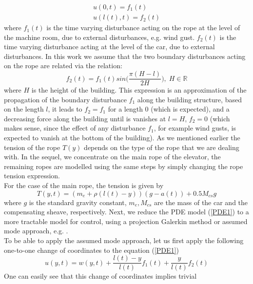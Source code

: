 \documentclass[letterpaper, 11 pt, conference]{ieeeconf}
\begin{document}
\begin{equation}\label{BC1}
\begin{array}{l}
u(0,t)=f_{1}(t)\\
u(l(t),t)=f_{2}(t)
\end{array}
\end{equation}
where $f_1(t)$ is the time varying disturbance acting on the rope
at the level of the machine room, due to external disturbances,
e.g. wind gust. $f_2(t)$ is the time varying disturbance acting at
the level of the car, due to external disturbances. In this work
we assume that the two boundary disturbances acting on the rope
are related via the relation:
\begin{equation}\label{BC_relation}
f_{2}(t)=f_{1}(t)sin\big(\frac{\pi(H-l)}{2H}\big),\;H\in\mathbb{R}
\end{equation}
where $H$ is the height of the building. This expression is an
approximation of the propagation of the boundary disturbance
$f_{1}$ along the building structure, based on the length $l$, it
leads to $f_{2}=f_{1}$ for a length $0$ (which is expected), and a
decreasing force along the building until is vanishes at $l=H$,
$f_{2}=0$ (which makes sense, since the effect of any disturbance
$f_{1}$, for example wind gusts, is expected to vanish at the
bottom of the building). As we mentioned earlier the tension of
the rope $T(y)$ depends on the type of the rope that we are
dealing with. In the sequel, we concentrate on the main rope of
the elevator, the remaining ropes are modelled using the same
steps by simply changing the rope
tension expression.\\
For the case of the main rope, the tension is given by
\begin{equation}\label{tension1}
T(y,t)=(m_e+\rho(l(t)-y))(g-a(t))+0.5 M_{cs}g
\end{equation}
where $g$ is the standard gravity constant, $m_e, M_{cs}$ are the
mass of the car and the compensating sheave, respectively.
Next, we reduce the PDE model (\ref{PDE1}) to a more tractable
model for control, using a projection Galerkin method or assumed
mode approach, e.g. \cite{M67,HLB96}.\\To be able to apply the
assumed mode approach, let us first apply the following one-to-one
change of coordinates to the equation (\ref{PDE1})
\begin{equation}\label{change_of_coordinates}
u(y,t)=w(y,t)+\frac{l(t)-y}{l(t)}f_{1}(t)+\frac{y}{l(t)}f_{2}(t)
\end{equation}
One can easily see that this change of coordinates implies trivial
\end{document}
